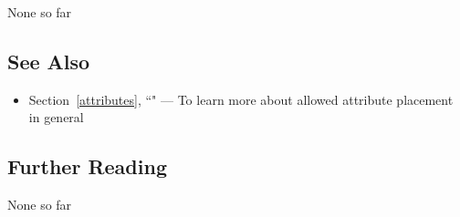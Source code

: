 None so far

\subsection[See Also]{See Also}\label{see-also}

\begin{itemize}
\item{Section~\ref{attributes}, ``" — To learn more about allowed attribute placement in general}
\end{itemize}

\subsection[Further Reading]{Further Reading}\label{further-reading}

None so far



